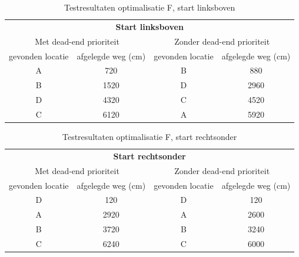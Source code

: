 \documentclass[tt2]{penoverslag}
\begin{document}
\begin{table}[!hb]
\begin{center}
    \begin{tabular}{ c | c || c | c }
    \multicolumn{4}{c}{\textbf{Start linksboven}} \\ 
   \multicolumn{2}{c||}{Met dead-end prioriteit} & \multicolumn{2}{|c}{Zonder dead-end prioriteit}\\
     gevonden locatie & afgelegde weg (cm) & gevonden locatie &  afgelegde weg (cm)\\ \hline\hline
    A & {\color{green}720} & B & {\color{green}880} \\ \hline
    B & {\color{green}1520} & D & {\color{green}2960} \\ \hline
    D & {\color{green}4320} & C & {\color{green}4520} \\ \hline
    C & {\color{red}6120} & A & {\color{red}5920}\\
    \end{tabular}
    \caption{Testresultaten optimalisatie F, start linksboven}
    \label{tab:resultVerken}
\end{center}
\end{table}

\begin{table}[!hb]
\begin{center}
    \begin{tabular}{c | c || c | c }
    \multicolumn{4}{c}{\textbf{Start rechtsonder}} \\
   \multicolumn{2}{c||}{Met dead-end prioriteit} & \multicolumn{2}{|c}{Zonder dead-end prioriteit}\\
     gevonden locatie &  afgelegde weg (cm) & gevonden locatie &  afgelegde weg (cm)\\ \hline\hline
    D & 120 & D & 120 \\ \hline
    A & {\color{red}2920} & A & {\color{red}2600} \\ \hline
    B & {\color{red}3720} & B & {\color{red}3240} \\ \hline
    C & {\color{red}6240} & C & {\color{red}6000}\\
    \end{tabular}
    \caption{Testresultaten optimalisatie F, start rechtsonder}
    \label{tab:resultVerken}
\end{center}
\end{table}
\end{document}
